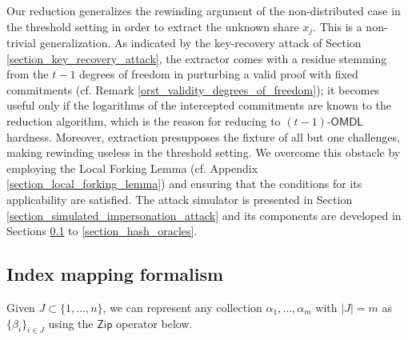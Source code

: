 \documentclass{iacrtrans}
\begin{document}
Our reduction generalizes the rewinding argument
of the non-distributed case in the threshold setting
in order to extract the unknown share $x_j$.
This is a non-trivial generalization.
As indicated by the key-recovery attack
of Section \ref{section_key_recovery_attack},
the extractor comes with a residue
stemming from the $t-1$ degrees of freedom in purturbing a valid proof
with fixed commitments
(cf. Remark \ref{orst_validity_degrees_of_freedom});
it becomes useful only if the logarithms
of the intercepted commitments
are known to the reduction algorithm,
which is the reason for reducing to
$(t-1)$-$\textsf{OMDL}$ hardness.
Moreover, extraction presupposes the fixture of
all but one challenges,
making rewinding useless
in the threshold setting. We overcome this obstacle
by employing the Local Forking Lemma
(cf. Appendix \ref{section_local_forking_lemma})
and ensuring that the conditions for its applicability
are satisfied. The attack simulator is presented
in Section \ref{section_simulated_impersonation_attack}
and its components are developed in Sections
\ref{section_index_mapping} to
\ref{section_hash_oracles}.


\subsection{Index mapping formalism}\label{section_index_mapping}

Given $J \subset \{1, \dots, n\}$,
we can represent any collection
$\alpha_1, \dots, \alpha_m$ with $|J|=m$
as $\{\beta_i\}_{i \in J}$ using the
$\mathsf{Zip}$ operator below.
\end{document}
